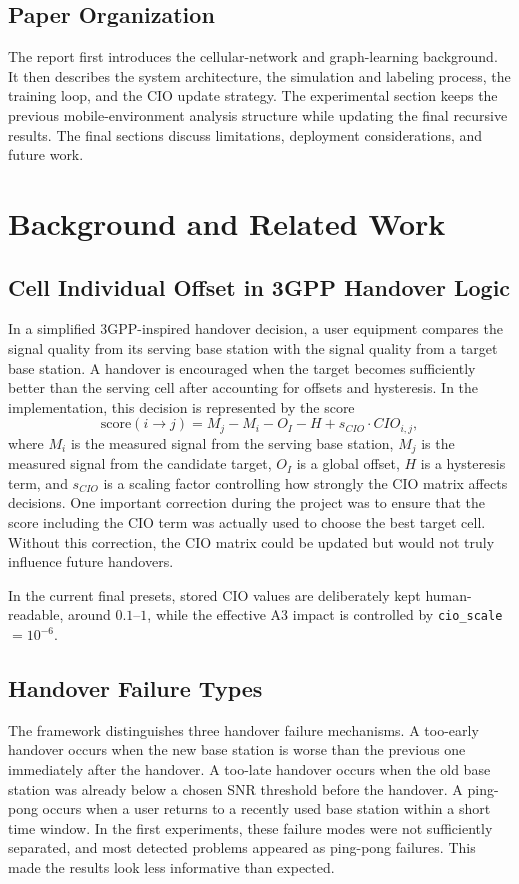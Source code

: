 \documentclass[11pt,a4paper]{article}
\begin{document}
\subsection{Paper Organization}
The report first introduces the cellular-network and graph-learning background. It then describes the system architecture, the simulation and labeling process, the training loop, and the CIO update strategy. The experimental section keeps the previous mobile-environment analysis structure while updating the final recursive results. The final sections discuss limitations, deployment considerations, and future work.

\section{Background and Related Work}
\label{sec:background}

\subsection{Cell Individual Offset in 3GPP Handover Logic}
In a simplified 3GPP-inspired handover decision, a user equipment compares the signal quality from its serving base station with the signal quality from a target base station. A handover is encouraged when the target becomes sufficiently better than the serving cell after accounting for offsets and hysteresis. In the implementation, this decision is represented by the score
\begin{equation}
\mathrm{score}(i\rightarrow j)=M_j-M_i-O_I-H+s_{CIO}\cdot CIO_{i,j},
\end{equation}
where $M_i$ is the measured signal from the serving base station, $M_j$ is the measured signal from the candidate target, $O_I$ is a global offset, $H$ is a hysteresis term, and $s_{CIO}$ is a scaling factor controlling how strongly the CIO matrix affects decisions. One important correction during the project was to ensure that the score including the CIO term was actually used to choose the best target cell. Without this correction, the CIO matrix could be updated but would not truly influence future handovers.

In the current final presets, stored CIO values are deliberately kept human-readable, around $0.1$--$1$, while the effective A3 impact is controlled by \texttt{cio\_scale} $=10^{-6}$.

\subsection{Handover Failure Types}
The framework distinguishes three handover failure mechanisms. A too-early handover occurs when the new base station is worse than the previous one immediately after the handover. A too-late handover occurs when the old base station was already below a chosen SNR threshold before the handover. A ping-pong occurs when a user returns to a recently used base station within a short time window. In the first experiments, these failure modes were not sufficiently separated, and most detected problems appeared as ping-pong failures. This made the results look less informative than expected.
\end{document}

